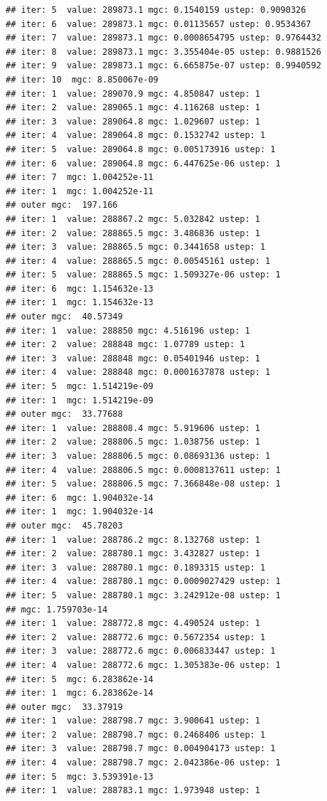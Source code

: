\documentclass{article}\usepackage[]{graphicx}\usepackage[]{xcolor}
\makeatletter
\newenvironment{kframe}{%
 \def\at@end@of@kframe{}%
 \ifinner\ifhmode%
  \def\at@end@of@kframe{\end{minipage}}%
  \begin{minipage}{\columnwidth}%
 \fi\fi%
 \def\FrameCommand##1{\hskip\@totalleftmargin \hskip-\fboxsep
 \colorbox{shadecolor}{##1}\hskip-\fboxsep
     \hskip-\linewidth \hskip-\@totalleftmargin \hskip\columnwidth}%
 \MakeFramed {\advance\hsize-\width
   \@totalleftmargin\z@ \linewidth\hsize
   \@setminipage}}%
 {\par\unskip\endMakeFramed%
 \at@end@of@kframe}
\newenvironment{knitrout}{}{} %
\makeatother
\begin{document}
\begin{knitrout}
\begin{kframe}
\begin{verbatim}
## iter: 5  value: 289873.1 mgc: 0.1540159 ustep: 0.9090326 
## iter: 6  value: 289873.1 mgc: 0.01135657 ustep: 0.9534367 
## iter: 7  value: 289873.1 mgc: 0.0008654795 ustep: 0.9764432 
## iter: 8  value: 289873.1 mgc: 3.355404e-05 ustep: 0.9881526 
## iter: 9  value: 289873.1 mgc: 6.665875e-07 ustep: 0.9940592 
## iter: 10  mgc: 8.850067e-09 
## iter: 1  value: 289070.9 mgc: 4.850847 ustep: 1 
## iter: 2  value: 289065.1 mgc: 4.116268 ustep: 1 
## iter: 3  value: 289064.8 mgc: 1.029607 ustep: 1 
## iter: 4  value: 289064.8 mgc: 0.1532742 ustep: 1 
## iter: 5  value: 289064.8 mgc: 0.005173916 ustep: 1 
## iter: 6  value: 289064.8 mgc: 6.447625e-06 ustep: 1 
## iter: 7  mgc: 1.004252e-11 
## iter: 1  mgc: 1.004252e-11 
## outer mgc:  197.166 
## iter: 1  value: 288867.2 mgc: 5.032842 ustep: 1 
## iter: 2  value: 288865.5 mgc: 3.486836 ustep: 1 
## iter: 3  value: 288865.5 mgc: 0.3441658 ustep: 1 
## iter: 4  value: 288865.5 mgc: 0.00545161 ustep: 1 
## iter: 5  value: 288865.5 mgc: 1.509327e-06 ustep: 1 
## iter: 6  mgc: 1.154632e-13 
## iter: 1  mgc: 1.154632e-13 
## outer mgc:  40.57349 
## iter: 1  value: 288850 mgc: 4.516196 ustep: 1 
## iter: 2  value: 288848 mgc: 1.07789 ustep: 1 
## iter: 3  value: 288848 mgc: 0.05401946 ustep: 1 
## iter: 4  value: 288848 mgc: 0.0001637878 ustep: 1 
## iter: 5  mgc: 1.514219e-09 
## iter: 1  mgc: 1.514219e-09 
## outer mgc:  33.77688 
## iter: 1  value: 288808.4 mgc: 5.919606 ustep: 1 
## iter: 2  value: 288806.5 mgc: 1.038756 ustep: 1 
## iter: 3  value: 288806.5 mgc: 0.08693136 ustep: 1 
## iter: 4  value: 288806.5 mgc: 0.0008137611 ustep: 1 
## iter: 5  value: 288806.5 mgc: 7.366848e-08 ustep: 1 
## iter: 6  mgc: 1.904032e-14 
## iter: 1  mgc: 1.904032e-14 
## outer mgc:  45.78203 
## iter: 1  value: 288786.2 mgc: 8.132768 ustep: 1 
## iter: 2  value: 288780.1 mgc: 3.432827 ustep: 1 
## iter: 3  value: 288780.1 mgc: 0.1893315 ustep: 1 
## iter: 4  value: 288780.1 mgc: 0.0009027429 ustep: 1 
## iter: 5  value: 288780.1 mgc: 3.242912e-08 ustep: 1 
## mgc: 1.759703e-14 
## iter: 1  value: 288772.8 mgc: 4.490524 ustep: 1 
## iter: 2  value: 288772.6 mgc: 0.5672354 ustep: 1 
## iter: 3  value: 288772.6 mgc: 0.006833447 ustep: 1 
## iter: 4  value: 288772.6 mgc: 1.305383e-06 ustep: 1 
## iter: 5  mgc: 6.283862e-14 
## iter: 1  mgc: 6.283862e-14 
## outer mgc:  33.37919 
## iter: 1  value: 288798.7 mgc: 3.900641 ustep: 1 
## iter: 2  value: 288798.7 mgc: 0.2468406 ustep: 1 
## iter: 3  value: 288798.7 mgc: 0.004904173 ustep: 1 
## iter: 4  value: 288798.7 mgc: 2.042386e-06 ustep: 1 
## iter: 5  mgc: 3.539391e-13 
## iter: 1  value: 288783.1 mgc: 1.973948 ustep: 1 

\end{verbatim}
\end{kframe}
\end{knitrout}
\end{document}
